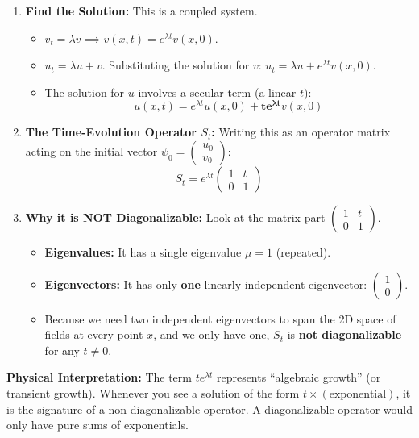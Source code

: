 \documentclass[oneside]{book}
\begin{document}
\begin{enumerate}
    \item \textbf{Find the Solution:}
    This is a coupled system.
    \begin{itemize}
        \item $v_t = \lambda v \implies v(x,t) = e^{\lambda t} v(x,0)$.
        \item $u_t = \lambda u + v$. Substituting the solution for $v$:
        $u_t = \lambda u + e^{\lambda t} v(x,0)$.
        \item The solution for $u$ involves a secular term (a linear $t$):
        \[ u(x,t) = e^{\lambda t} u(x,0) + \mathbf{t e^{\lambda t}} v(x,0) \]
    \end{itemize}

    \item \textbf{The Time-Evolution Operator $S_t$:}
    Writing this as an operator matrix acting on the initial vector $\psi_0 = \begin{pmatrix} u_0 \\ v_0 \end{pmatrix}$:
    \[ S_t = e^{\lambda t} \begin{pmatrix} 1 & t \\ 0 & 1 \end{pmatrix} \]

    \item \textbf{Why it is NOT Diagonalizable:}
    Look at the matrix part $\begin{pmatrix} 1 & t \\ 0 & 1 \end{pmatrix}$.
    \begin{itemize}
        \item \textbf{Eigenvalues:} It has a single eigenvalue $\mu = 1$ (repeated).
        \item \textbf{Eigenvectors:} It has only \textbf{one} linearly independent eigenvector: $\begin{pmatrix} 1 \\ 0 \end{pmatrix}$.
        \item Because we need two independent eigenvectors to span the 2D space of fields at every point $x$, and we only have one, $S_t$ is \textbf{not diagonalizable} for any $t \neq 0$.
    \end{itemize}
\end{enumerate}

\textbf{Physical Interpretation:} The term $t e^{\lambda t}$ represents ``algebraic growth'' (or transient growth). Whenever you see a solution of the form $t \times (\text{exponential})$, it is the signature of a non-diagonalizable operator. A diagonalizable operator would only have pure sums of exponentials.
\end{document}
